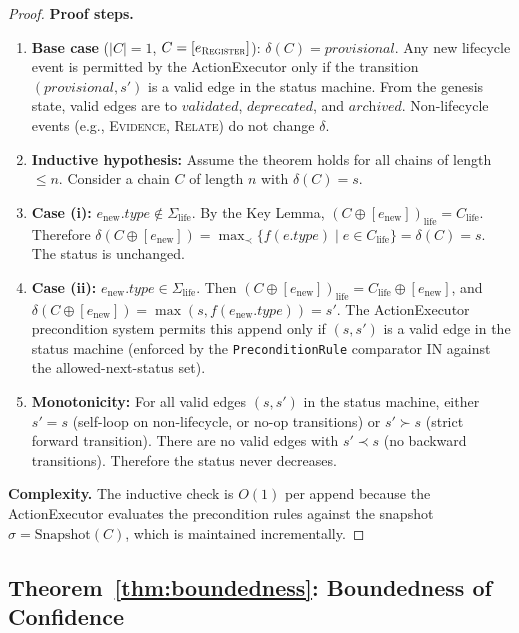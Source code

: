 \begin{proof}
\textbf{Proof steps.}
\begin{enumerate}[label=Step~\arabic*:,leftmargin=2em]
    \item \textbf{Base case} ($|C| = 1$, $C = [e_{\textsc{Register}}]$): $\delta(C) = \textit{provisional}$. Any new lifecycle event is permitted by the ActionExecutor only if the transition $(\textit{provisional}, s')$ is a valid edge in the status machine. From the genesis state, valid edges are to $\textit{validated}$, $\textit{deprecated}$, and $\textit{archived}$. Non-lifecycle events (e.g., \textsc{Evidence}, \textsc{Relate}) do not change $\delta$.
    \item \textbf{Inductive hypothesis:} Assume the theorem holds for all chains of length $\leq n$. Consider a chain $C$ of length $n$ with $\delta(C) = s$.
    \item \textbf{Case (i):} $e_{\text{new}}.\textit{type} \notin \Sigma_{\text{life}}$. By the Key Lemma, $(C \oplus [e_{\text{new}}])_{\text{life}} = C_{\text{life}}$. Therefore $\delta(C \oplus [e_{\text{new}}]) = \max_{\prec}\{f(e.\textit{type}) \mid e \in C_{\text{life}}\} = \delta(C) = s$. The status is unchanged.
    \item \textbf{Case (ii):} $e_{\text{new}}.\textit{type} \in \Sigma_{\text{life}}$. Then $(C \oplus [e_{\text{new}}])_{\text{life}} = C_{\text{life}} \oplus [e_{\text{new}}]$, and $\delta(C \oplus [e_{\text{new}}]) = \max(s, f(e_{\text{new}}.\textit{type})) = s'$. The ActionExecutor precondition system permits this append only if $(s, s')$ is a valid edge in the status machine (enforced by the \texttt{PreconditionRule} comparator \textsc{IN} against the allowed-next-status set).
    \item \textbf{Monotonicity:} For all valid edges $(s, s')$ in the status machine, either $s' = s$ (self-loop on non-lifecycle, or no-op transitions) or $s' \succ s$ (strict forward transition). There are no valid edges with $s' \prec s$ (no backward transitions). Therefore the status never decreases.
\end{enumerate}

\textbf{Complexity.} The inductive check is $O(1)$ per append because the ActionExecutor evaluates the precondition rules against the snapshot $\sigma = \text{Snapshot}(C)$, which is maintained incrementally.
\end{proof}

\subsection{Theorem~\ref{thm:boundedness}: Boundedness of Confidence}

